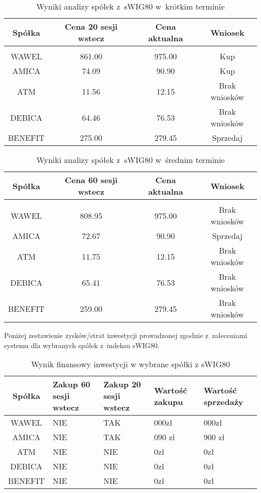 \begin{table}[H]
	\centering
	\begin{tabular}{ c c c c}
	Spółka & Cena 20 sesji wstecz & Cena aktualna & Wniosek \\ \hline \\
	WAWEL & 861.00 & 975.00 & Kup \\
	AMICA & 74.09 & 90.90 & Kup \\
	ATM & 11.56 & 12.15 & Brak wniosków \\
	DEBICA & 64.46 & 76.53 & Brak wniosków \\
	BENEFIT & 275.00 & 279.45 & Sprzedaj \\
	\end{tabular}
	\caption{Wyniki analizy spółek z~sWIG80 w~krótkim terminie}
	\label{tab:swig80short}
\end{table}

\begin{table}[H]
	\centering
	\begin{tabular}{ c c c c}
	Spółka & Cena 60 sesji wstecz & Cena aktualna & Wniosek \\ \hline \\
	WAWEL & 808.95 & 975.00 & Brak wniosków \\
	AMICA & 72.67 & 90.90 & Sprzedaj \\
	ATM & 11.75 & 12.15 & Brak wniosków \\
	DEBICA & 65.41 & 76.53 & Brak wniosków \\
	BENEFIT & 259.00 & 279.45 & Brak wniosków \\
	\end{tabular}
	\caption{Wyniki analizy spółek z~sWIG80 w~średnim terminie}
	\label{tab:swig80medium}
\end{table}

Poniżej zestawienie zysków/strat inwestycji prowadzonej zgodnie z~zaleceniami systemu dla wybranych spółek z~indeksu sWIG80.

\begin{table}[H]
	\centering
	\begin{tabular}{ | c | >{\centering\arraybackslash}p{3cm} | >{\centering\arraybackslash}p{3cm} | >{\centering\arraybackslash}p{2cm} | >{\centering\arraybackslash}p{2cm} |}
	\hline
	Spółka & Zakup 60 sesji wstecz & Zakup 20 sesji wstecz & Wartość zakupu & Wartość sprzedaży \\ \hline
	WAWEL & NIE & TAK & 861 000zł & 975 000zł \\ \hline
	AMICA & NIE & TAK & 74 090 zł & 90 900 zł \\ \hline
	ATM & NIE & NIE & 0zł & 0zł \\ \hline
	DEBICA & NIE & NIE & 0zł & 0zł \\ \hline
	BENEFIT & NIE & NIE & 0zł & 0zł \\ \hline
	\end{tabular}
	\caption{Wynik finansowy inwestycji w wybrane spółki z sWIG80}
	\label{tab:mwig40buy}
\end{table}

